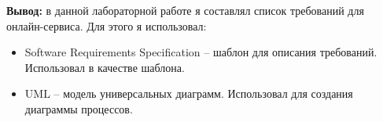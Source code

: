 \bigskip

\textbf{Вывод:}
в данной лабораторной работе я составлял список требований для онлайн-сервиса.
Для этого я использовал:
\begin{itemize}
    \item Software Requirements Specification -- шаблон для описания требований.
    Использовал в качестве шаблона.
    \item UML -- модель универсальных диаграмм.
    Использовал для создания диаграммы процессов.
\end{itemize}
